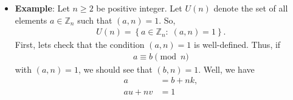 \documentclass{report}
\begin{document}
\begin{itemize}
\begin{align*}
            .\end{align*}
            Consider $q_{1}, q_{2}, q_{3} \in G$, with
            \begin{align*}
                q_{1} = \frac{a}{b},\; q_{2} = \frac{c}{d}, \; q_{3} = \frac{e}{f}
            .\end{align*}
            Then, 
            \begin{align*}
                q_{1}q_{2} = \frac{a}{b} \cdot \frac{c}{d} = \frac{ac}{bd}
            .\end{align*}
            It should be clear that $a,b,c,d \ne 0$, so $q_{1}q_{2} \in G$. Thus, we have closure. Next, 
            \begin{align*}
                q_{1} \cdot (q_{2} \cdot q_{3}) = (q_{1} \cdot q_{2}) \cdot q_{3}
            \end{align*}
            since multiplication is associative. Also, 
            \begin{align*}
                q_{1} q_{2} = q_{2}q_{1}
            \end{align*}
            since multiplication is commutative. Clearly $e=1$ is the identity, since $1 \in G $ and $1q = q$ for all $q \in G$. Also, for 
            \begin{align*}
                q = \frac{a}{b} \in G
            ,\end{align*}
            \begin{align*}
                q \cdot \frac{1}{q} = \frac{a}{b} \cdot \frac{b}{a} = 1
            .\end{align*}
            Thus, $q^{-1} = \frac{1}{q}$.
        \item \textbf{Example}: Let $n \geq 2$ be positive integer. Let $U(n)$ denote the set of all elements $a \in \mathbb{Z}_{n}$ such that $(a,n) = 1$.
            \bigbreak \noindent 
            So,
            \begin{align*}
                U(n) = \left\{a \in \mathbb{Z}_{n}:\; (a,n) = 1\right\}
            .\end{align*}
            First, lets check that the condition $(a,n) = 1$ is well-defined. Thus, if 
            \begin{align*}
                a \equiv b \pmod{n}
            \end{align*}
            with $(a,n)=1$, we should see that $(b,n) =1$. Well, we have
            \begin{align*}
                a &= b + nk, \\
                au + nv &= 1

\end{align*}
\end{itemize}
\end{document}
